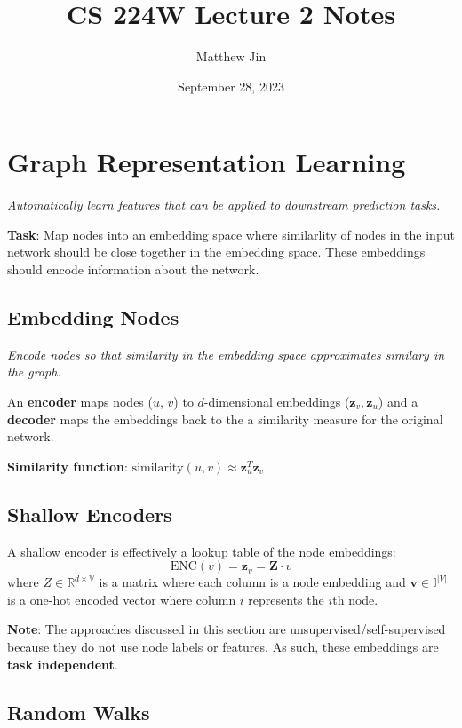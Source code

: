 \documentclass[12pt]{article}
\begin{document}
\title{CS 224W Lecture 2 Notes}
\author{Matthew Jin}
\date{September 28, 2023}
\maketitle

\section*{Graph Representation Learning}

\textit{Automatically learn features that can be applied to downstream
prediction tasks.}

\medskip
\textbf{Task}: Map nodes into an embedding space where similarlity of nodes in
the input network should be close together in the embedding space. These
embeddings should encode information about the network.

\subsection*{Embedding Nodes}

\textit{Encode nodes so that similarity in the embedding space approximates similary in the graph.}

\medskip
An \textbf{encoder} maps nodes ($u$, $v$) to $d$-dimensional embeddings
($\mathbf{z}_v, \mathbf{z}_u$) and a \textbf{decoder} maps the embeddings back
to the a similarity measure for the original network.

\medskip
\textbf{Similarity function}: $\text{similarity}(u,v) \approx \mathbf{z}_u^T
\mathbf{z}_v$

\subsection*{Shallow Encoders}
A shallow encoder is effectively a lookup table of the node embeddings:
\[
  \text{ENC}(v) = \mathbf{z}_v = \mathbf{Z} \cdot v
\]
where $Z \in \mathbb{R}^{d \times \mathbb{V}}$ is a matrix where each column is
a node embedding and $\mathbf{v} \in \mathbb{I}^{|V|}$ is a one-hot encoded
vector where column $i$ represents the $i$th node.

\medskip
\textbf{Note}: The approaches discussed in this section are
unsupervised/self-supervised because they do not use node labels or features. As
such, these embeddings are \textbf{task independent}.

\subsection*{Random Walks}
\end{document}
